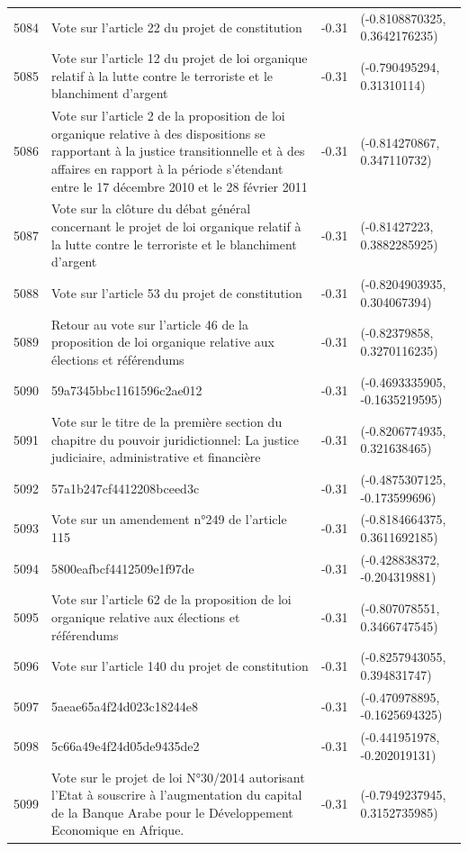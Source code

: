 \begin{table}[ht]
\begin{tabular}{rlrl}
  5084 & Vote sur l'article 22 du projet de constitution & -0.31 & (-0.8108870325, 0.3642176235) \\ 
  5085 & Vote sur l'article 12 du projet de loi organique relatif à la lutte contre le terroriste et le blanchiment d'argent & -0.31 & (-0.790495294, 0.31310114) \\ 
  5086 & Vote sur l'article 2 de la proposition de loi organique relative à des dispositions se rapportant à la justice transitionnelle et à des affaires en rapport à la période s'étendant entre le 17 décembre 2010 et le 28 février 2011 & -0.31 & (-0.814270867, 0.347110732) \\ 
  5087 & Vote sur la clôture du débat général concernant le projet de loi organique relatif à la lutte contre le terroriste et le blanchiment d'argent & -0.31 & (-0.81427223, 0.3882285925) \\ 
  5088 & Vote sur l'article 53 du projet de constitution & -0.31 & (-0.8204903935, 0.304067394) \\ 
  5089 & Retour au vote sur l'article 46 de la proposition de loi organique relative aux élections et référendums & -0.31 & (-0.82379858, 0.3270116235) \\ 
  5090 & 59a7345bbc1161596c2ae012 & -0.31 & (-0.4693335905, -0.1635219595) \\ 
  5091 & Vote sur le titre de la première section du chapitre du pouvoir juridictionnel: La justice judiciaire, administrative et financière & -0.31 & (-0.8206774935, 0.321638465) \\ 
  5092 & 57a1b247cf4412208bceed3c & -0.31 & (-0.4875307125, -0.173599696) \\ 
  5093 & Vote sur un amendement n°249 de l'article 115 & -0.31 & (-0.8184664375, 0.3611692185) \\ 
  5094 & 5800eafbcf4412509e1f97de & -0.31 & (-0.428838372, -0.204319881) \\ 
  5095 & Vote sur l'article 62 de la proposition de loi organique relative aux élections et référendums & -0.31 & (-0.807078551, 0.3466747545) \\ 
  5096 & Vote sur l'article 140 du projet de constitution & -0.31 & (-0.8257943055, 0.394831747) \\ 
  5097 & 5aeae65a4f24d023c18244e8 & -0.31 & (-0.470978895, -0.1625694325) \\ 
  5098 & 5c66a49e4f24d05de9435de2 & -0.31 & (-0.441951978, -0.202019131) \\ 
  5099 & Vote sur le projet de loi N°30/2014 autorisant l'Etat à souscrire à l'augmentation du capital de la Banque Arabe pour le Développement Economique en Afrique. & -0.31 & (-0.7949237945, 0.3152735985) \\ 

\end{tabular}
\end{table}
